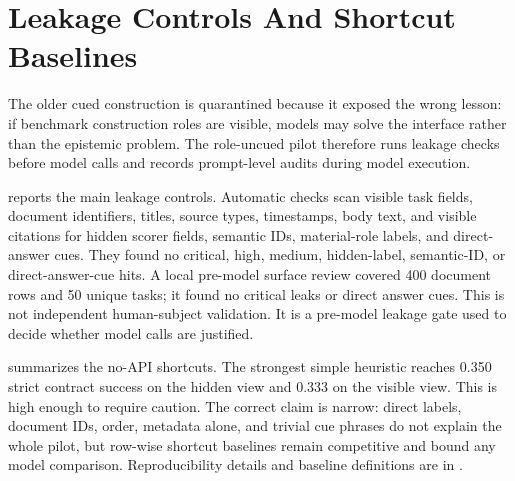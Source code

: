 \section{Leakage Controls And Shortcut Baselines}

The older cued construction is quarantined because it exposed the wrong lesson: if benchmark construction roles are visible, models may solve the interface rather than the epistemic problem. The role-uncued pilot therefore runs leakage checks before model calls and records prompt-level audits during model execution.



 reports the main leakage controls. Automatic checks scan visible task fields, document identifiers, titles, source types, timestamps, body text, and visible citations for hidden scorer fields, semantic IDs, material-role labels, and direct-answer cues. They found no critical, high, medium, hidden-label, semantic-ID, or direct-answer-cue hits. A local pre-model surface review covered 400 document rows and 50 unique tasks; it found no critical leaks or direct answer cues. This is not independent human-subject validation. It is a pre-model leakage gate used to decide whether model calls are justified.



 summarizes the no-API shortcuts. The strongest simple heuristic reaches 0.350 strict contract success on the hidden view and 0.333 on the visible view. This is high enough to require caution. The correct claim is narrow: direct labels, document IDs, order, metadata alone, and trivial cue phrases do not explain the whole pilot, but row-wise shortcut baselines remain competitive and bound any model comparison. Reproducibility details and baseline definitions are in .
